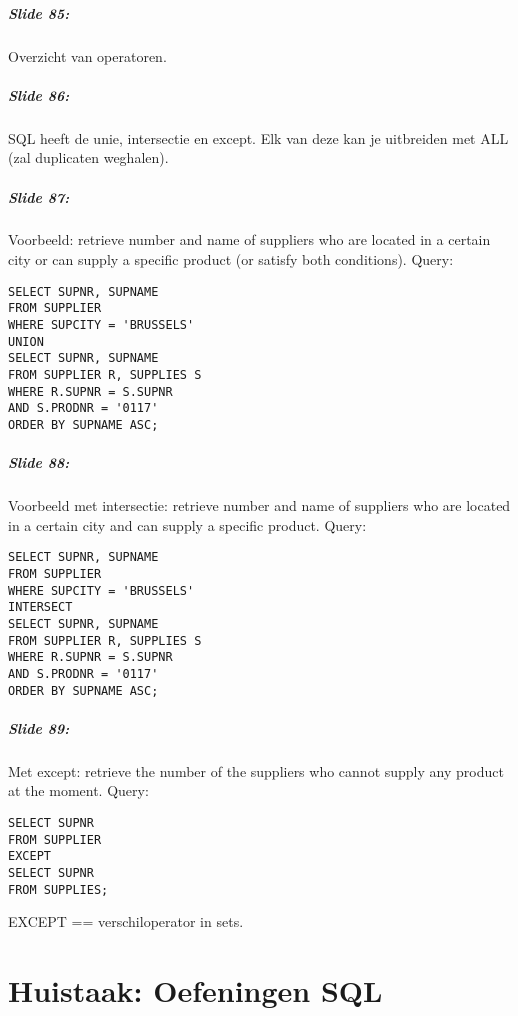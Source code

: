 \documentclass[10pt,a4paper]{report}
\begin{document}
\paragraph{Slide 85:}Overzicht van operatoren.

\paragraph{Slide 86:}SQL heeft de unie, intersectie en except. Elk van deze kan je uitbreiden met ALL (zal duplicaten weghalen).

\paragraph{Slide 87:}Voorbeeld: retrieve number and name of suppliers who are located in a certain city or can supply a specific product (or satisfy both conditions). Query:
\begin{verbatim}
SELECT SUPNR, SUPNAME
FROM SUPPLIER
WHERE SUPCITY = 'BRUSSELS'
UNION
SELECT SUPNR, SUPNAME
FROM SUPPLIER R, SUPPLIES S
WHERE R.SUPNR = S.SUPNR
AND S.PRODNR = '0117'
ORDER BY SUPNAME ASC;
\end{verbatim}

\paragraph{Slide 88:}Voorbeeld met intersectie: retrieve number and name of suppliers who are located in a certain city and can supply a specific product. Query:
\begin{verbatim}
SELECT SUPNR, SUPNAME
FROM SUPPLIER
WHERE SUPCITY = 'BRUSSELS'
INTERSECT
SELECT SUPNR, SUPNAME
FROM SUPPLIER R, SUPPLIES S
WHERE R.SUPNR = S.SUPNR
AND S.PRODNR = '0117'
ORDER BY SUPNAME ASC;
\end{verbatim}

\paragraph{Slide 89:}Met except: retrieve the number of the suppliers who cannot supply any product at the moment. Query:
\begin{verbatim}
SELECT SUPNR
FROM SUPPLIER
EXCEPT
SELECT SUPNR
FROM SUPPLIES;
\end{verbatim}
EXCEPT == verschiloperator in sets.

\chapter{Huistaak: Oefeningen SQL}
\end{document}
